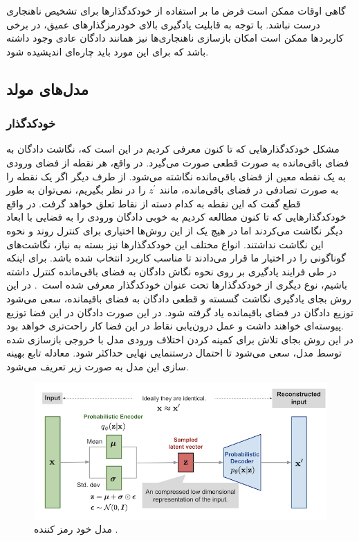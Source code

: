 \documentclass[12pt,a4paper]{report}
\begin{document}
گاهی اوقات ممکن است فرض ما بر استفاده از خودکدگذارها برای تشخیص ناهنجاری درست نباشد. با توجه به قابلیت یادگیری بالای خودرمزگذار‌های عمیق، در برخی کاربرد‌ها ممکن است امکان بازسازی ناهنجاری‌ها نیز همانند دادگان عادی وجود داشته باشد که برای این مورد باید چاره‌ای اندیشیده شود\cite{https://doi.org/10.48550/arxiv.1904.02639}. 

\subsection{مدل‌های مولد}

\subsubsection{ خودکدگذار }
مشکل خودکدگذار‌هایی که تا کنون معرفی کردیم در این است که، نگاشت دادگان به فضای باقی‌مانده به صورت قطعی صورت می‌گیرد. در واقع، هر نقطه از فضای ورودی به یک نقطه معین از فضای باقی‌مانده نگاشته می‌شود. از طرف دیگر اگر یک نقطه را به صورت تصادفی در فضای باقی‌مانده، مانند 
$z^{'}$
 را در نظر بگیریم، نمی‌توان به طور قطع گفت که این نقطه به کدام دسته از نقاط تعلق خواهد گرفت. در واقع خودکدگذار‌هایی که تا کنون مطالعه کردیم به خوبی دادگان ورودی را به فضایی با ابعاد دیگر نگاشت می‌کردند اما در هیچ یک از این روش‌ها اختیاری برای کنترل روند و نحوه این نگاشت نداشتند. انواع مختلف این خودکدگذارها نیز بسته به نیاز، نگاشت‌های گوناگونی را در اختیار ما قرار می‌دادند تا مناسب کاربرد انتخاب شده باشد. برای اینکه در طی فرایند یادگیری بر روی نحوه نگاش دادگان به فضای باقی‌مانده کنترل داشته باشیم، نوع دیگری از خودکدگذار‌ها تحت عنوان خودکدگذار  معرفی شده است~\cite{Kingma_2019}. در این روش بجای یادگیری نگاشت گسسته و قطعی دادگان به فضای باقیمانده، سعی می‌شود توزیع دادگان در فضای باقیمانده یاد گرفته شود. در این صورت دادگان در این فضا توزیع پیوسته‌ای خواهند داشت و عمل درون‌یابی نقاط در این فضا کار راحت‌تری خواهد بود.\\

در این روش بجای تلاش برای کمینه کردن اختلاف ورودی مدل با خروجی بازسازی شده توسط مدل، سعی می‌شود تا احتمال درستنمایی نهایی حداکثر شود. معادله تابع بهینه سازی این مدل به صورت زیر تعریف می‌شود.
\begin{figure}[!h]
	\begin{center}
		\includegraphics[width=0.7\linewidth]{./images/figures/vae.png}
	\end{center}
	\caption{مدل خود رمز کننده  \cite{fromaetovae}.}
	\label{fig:vae}
	\centering
\end{figure}
\end{document}
